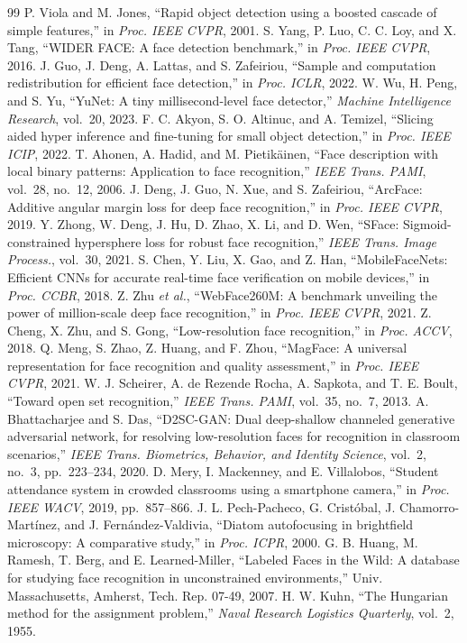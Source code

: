 \documentclass[conference,a4paper]{IEEEtran}
\begin{document}
\begin{thebibliography}{99}
\footnotesize
{} P. Viola and M. Jones, ``Rapid object detection using a boosted cascade of simple features,'' in \emph{Proc. IEEE CVPR}, 2001.
 S. Yang, P. Luo, C. C. Loy, and X. Tang, ``WIDER FACE: A face detection benchmark,'' in \emph{Proc. IEEE CVPR}, 2016.
 J. Guo, J. Deng, A. Lattas, and S. Zafeiriou, ``Sample and computation redistribution for efficient face detection,'' in \emph{Proc. ICLR}, 2022.
 W. Wu, H. Peng, and S. Yu, ``YuNet: A tiny millisecond-level face detector,'' \emph{Machine Intelligence Research}, vol.~20, 2023.
 F. C. Akyon, S. O. Altinuc, and A. Temizel, ``Slicing aided hyper inference and fine-tuning for small object detection,'' in \emph{Proc. IEEE ICIP}, 2022.
 T. Ahonen, A. Hadid, and M. Pietik\"ainen, ``Face description with local binary patterns: Application to face recognition,'' \emph{IEEE Trans. PAMI}, vol.~28, no.~12, 2006.
 J. Deng, J. Guo, N. Xue, and S. Zafeiriou, ``ArcFace: Additive angular margin loss for deep face recognition,'' in \emph{Proc. IEEE CVPR}, 2019.
 Y. Zhong, W. Deng, J. Hu, D. Zhao, X. Li, and D. Wen, ``SFace: Sigmoid-constrained hypersphere loss for robust face recognition,'' \emph{IEEE Trans. Image Process.}, vol.~30, 2021.
 S. Chen, Y. Liu, X. Gao, and Z. Han, ``MobileFaceNets: Efficient CNNs for accurate real-time face verification on mobile devices,'' in \emph{Proc. CCBR}, 2018.
 Z. Zhu \emph{et al.}, ``WebFace260M: A benchmark unveiling the power of million-scale deep face recognition,'' in \emph{Proc. IEEE CVPR}, 2021.
 Z. Cheng, X. Zhu, and S. Gong, ``Low-resolution face recognition,'' in \emph{Proc. ACCV}, 2018.
 Q. Meng, S. Zhao, Z. Huang, and F. Zhou, ``MagFace: A universal representation for face recognition and quality assessment,'' in \emph{Proc. IEEE CVPR}, 2021.
 W. J. Scheirer, A. de Rezende Rocha, A. Sapkota, and T. E. Boult, ``Toward open set recognition,'' \emph{IEEE Trans. PAMI}, vol.~35, no.~7, 2013.
 A. Bhattacharjee and S. Das, ``D2SC-GAN: Dual deep-shallow channeled generative adversarial network, for resolving low-resolution faces for recognition in classroom scenarios,'' \emph{IEEE Trans. Biometrics, Behavior, and Identity Science}, vol.~2, no.~3, pp.~223--234, 2020.
 D. Mery, I. Mackenney, and E. Villalobos, ``Student attendance system in crowded classrooms using a smartphone camera,'' in \emph{Proc. IEEE WACV}, 2019, pp.~857--866.
 J. L. Pech-Pacheco, G. Crist\'obal, J. Chamorro-Mart\'inez, and J. Fern\'andez-Valdivia, ``Diatom autofocusing in brightfield microscopy: A comparative study,'' in \emph{Proc. ICPR}, 2000.
 G. B. Huang, M. Ramesh, T. Berg, and E. Learned-Miller, ``Labeled Faces in the Wild: A database for studying face recognition in unconstrained environments,'' Univ. Massachusetts, Amherst, Tech. Rep. 07-49, 2007.
 H. W. Kuhn, ``The Hungarian method for the assignment problem,'' \emph{Naval Research Logistics Quarterly}, vol.~2, 1955.
\end{thebibliography}
\end{document}
